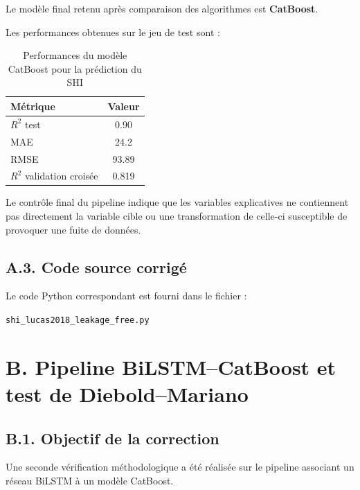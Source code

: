 Le modèle final retenu après comparaison des algorithmes est
\textbf{CatBoost}.

Les performances obtenues sur le jeu de test sont :

\begin{table}[htbp]
\centering
\caption{Performances du modèle CatBoost pour la prédiction du SHI}
\begin{tabular}{lc}
\hline
Métrique & Valeur \\
\hline
$R^2$ test & 0.90 \\
MAE & 24.2 \\
RMSE & 93.89 \\
$R^2$ validation croisée & 0.819 \\
\hline
\end{tabular}
\end{table}

Le contrôle final du pipeline indique que les variables explicatives ne
contiennent pas directement la variable cible ou une transformation de
celle-ci susceptible de provoquer une fuite de données.

\subsection*{A.3. Code source corrigé}

Le code Python correspondant est fourni dans le fichier :

\begin{center}
\texttt{shi\_lucas2018\_leakage\_free.py}
\end{center}




\section*{B. Pipeline BiLSTM--CatBoost et test de Diebold--Mariano}

\subsection*{B.1. Objectif de la correction}

Une seconde vérification méthodologique a été réalisée sur le pipeline
associant un réseau BiLSTM à un modèle CatBoost.

